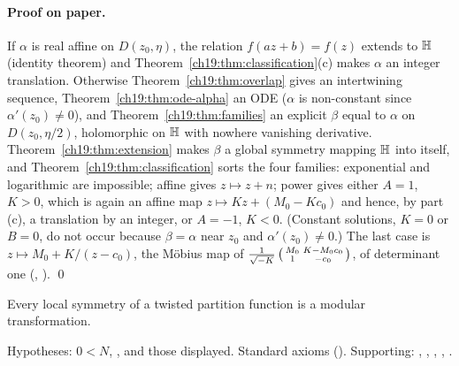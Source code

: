 \paragraph{Proof on paper.}  If $\alpha$ is real affine on $D(z_0,\eta)$, the relation $f(az+b)=f(z)$ extends to $\mathbb{H}$ (identity
theorem) and Theorem~\ref{ch19:thm:classification}(c) makes $\alpha$ an integer translation.  Otherwise Theorem~\ref{ch19:thm:overlap} gives an
intertwining sequence, Theorem~\ref{ch19:thm:ode-alpha} an ODE ($\alpha$ is non-constant since $\alpha'(z_0)\ne0$), and
Theorem~\ref{ch19:thm:families} an explicit $\beta$ equal to $\alpha$ on $D(z_0,\eta/2)$, holomorphic on $\mathbb{H}$ with nowhere vanishing
derivative.  Theorem~\ref{ch19:thm:extension} makes $\beta$ a global symmetry mapping $\mathbb{H}$ into itself, and
Theorem~\ref{ch19:thm:classification} sorts the four families: exponential and logarithmic are impossible; affine gives $z\mapsto z+n$;
power gives either $A=1$, $K>0$, which is again an affine map $z\mapsto Kz+(M_0-Kc_0)$ and hence, by part (c), a translation by an integer,
or $A=-1$, $K<0$.  (Constant solutions, $K=0$ or $B=0$, do not occur because $\beta=\alpha$ near $z_0$ and $\alpha'(z_0)\ne0$.)  The last case
is $z\mapsto M_0+K/(z-c_0)$, the M\"obius map of $\frac1{\sqrt{-K}}\left(\begin{smallmatrix}M_0&K-M_0c_0\\1&-c_0\end{smallmatrix}\right)$, of determinant one (,
). \qed
\begin{physics}Every local symmetry of a twisted partition function is a modular transformation.\end{physics}
\begin{status}Hypotheses: $0<N$, , and those displayed.  Standard axioms
().  Supporting: , ,
, , .\end{status}


